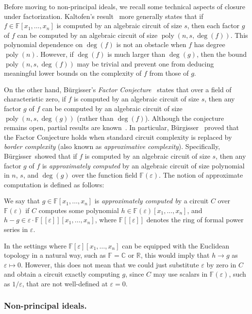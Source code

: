 \documentclass[10pt,a4paper]{amsart}
\newcommand*\Burgisser{B\"urgisser}
\DeclareMathOperator{\poly}{poly}
\newcommand*\R{\mathbb{R}}
\newcommand*\C{\mathbb{C}}
\newcommand*\F{\mathbb{F}}
\newcommand*\e{\varepsilon}
\begin{document}
Before moving to non-principal ideals, we recall some technical aspects of closure under factorization.
Kaltofen’s result~\cite{Kal86, Kal87, Kal89} more generally states that if $f \in \F[x_1,\dots,x_n]$ is computed by an algebraic circuit of size $s$, then each factor $g$ of $f$ can be computed by an algebraic circuit of size $\poly(n, s, \deg(f))$.  
This polynomial dependence on $\deg(f)$ is not an obstacle when $f$ has degree $\poly(n)$.
However, if $\deg(f)$ is much larger than $\deg(g)$, then the bound $\poly(n, s, \deg(f))$ may be trivial and prevent one from deducing meaningful lower bounds on the complexity of $f$ from those of $g$.  

On the other hand, \Burgisser's \emph{Factor Conjecture}~\cite[Conjecture~8.3]{Bur00} states that over a field of characteristic zero, if $f$ is computed by an algebraic circuit of size $s$, then any factor $g$ of $f$ can be computed by an algebraic circuit of size $\poly(n, s, \deg(g))$ (rather than $\deg(f)$).
Although the conjecture remains open, partial results are known~\cite{Kal86,Bur00,Bur04,DSS22}.
In particular, \Burgisser\ \cite{Bur04} proved that the Factor Conjecture holds when standard circuit complexity is replaced by \emph{border complexity} (also known as \emph{approximative complexity}).
Specifically, \Burgisser\ showed that if $f$ is computed by an algebraic circuit of size $s$, then any factor $g$ of $f$ is \emph{approximately computed} by an algebraic circuit of size polynomial in $n$, $s$, and $\deg(g)$ over the function field $\F(\e)$.
The notion of approximate computation is defined as follows:
\begin{defn}\label{defn:border_complexity}
We say that $g \in \F[x_1,\dots,x_n]$ is \emph{approximately computed b}y a circuit $C$ over $\F(\e)$ if $C$ computes some polynomial $h \in \F(\e)[x_1,\dots,x_n]$, and $h - g \in \e \cdot \F[[\e]][x_1,\dots,x_n]$, where $\F[[\e]]$ denotes the ring of formal power series in $\e$.
\end{defn}

In the settings where $\F[\e][x_1,\dots,x_n]$ can be equipped with the Euclidean topology in a natural way, such as $\F = \C$ or $\R$, this would imply that $h \to g$ as $\e \mapsto 0$.
However, this does not mean that we could just substitute $\e$ by zero in $C$ and obtain a circuit exactly computing $g$, since $C$ may use scalars in $\F(\e)$, such as $1/\e$, that are not well-defined at $\e = 0$.

\subsubsection*{Non-principal ideals.}
\end{document}
